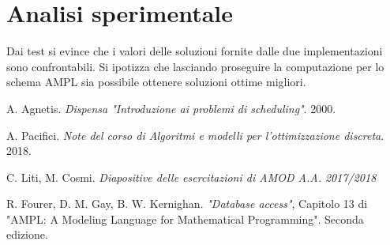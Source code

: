 \documentclass[a4paper]{article}
\begin{document}
\section{Analisi sperimentale}
Dai test si evince che i valori delle soluzioni fornite dalle due implementazioni sono confrontabili. Si ipotizza che lasciando proseguire la computazione per lo schema AMPL sia possibile ottenere soluzioni ottime migliori.

\begin{thebibliography}{1}
	 A. Agnetis.
	\emph{Dispensa "Introduzione ai problemi di scheduling"}. 2000.
	
	 A. Pacifici.
	\emph{Note del corso di Algoritmi e modelli per l'ottimizzazione discreta}.	2018.
	
	 C. Liti, M. Cosmi.
	\emph{Diapositive delle esercitazioni di AMOD A.A. 2017/2018}
	
	 R. Fourer, D. M. Gay, B. W. Kernighan.
	\emph{"Database access"}, Capitolo 13 di "AMPL: A Modeling Language 
		for Mathematical Programming". Seconda edizione.
\end{thebibliography}
\end{document}
